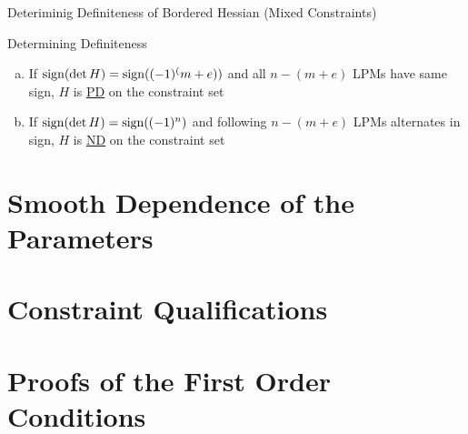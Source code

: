 \documentclass[a4paper,11pt]{article}
\begin{document}
\begin{frame}[t]{Deteriminig Definiteness of Bordered Hessian (Mixed Constraints)}
	\begin{block}{Determining Definiteness}
		\begin{enumerate}[(a)]
			\item If ${\rm sign}(\det H)={\rm sign}((-1)^(m+e))$ and all $n-(m+e)$ LPMs have same sign, $H$ is \uline{PD} on the constraint set
			\item If ${\rm sign}(\det H)={\rm sign}((-1)^n)$ and following $n-(m+e)$ LPMs alternates in sign, $H$ is \uline{ND} on the constraint set 
		\end{enumerate}
	\end{block}
\end{frame}

\section{Smooth Dependence of the Parameters} %
\label{sec:smooth_dependence_of_the_parameters}


\section{Constraint Qualifications} %
\label{sec:constraint_qualifications}


\section{Proofs of the First Order Conditions} %
\label{sec:proofs_of_the_first_order_conditions}

\end{document}
